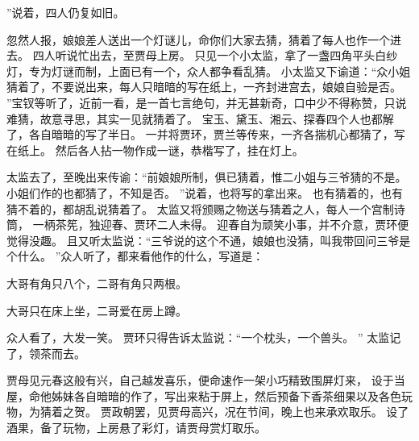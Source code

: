 ”说着，四人仍复如旧。
\par
忽然人报，娘娘差人送出一个灯谜儿，命你们大家去猜，猜着了每人也作一个进去。
四人听说忙出去，至贾母上房。
只见一个小太监，拿了一盏四角平头白纱灯，专为灯谜而制，上面已有一个，众人都争看乱猜。
小太监又下谕道：“众小姐猜着了，不要说出来，每人只暗暗的写在纸上，一齐封进宫去，娘娘自验是否。
”宝钗等听了，近前一看，是一首七言绝句，并无甚新奇，口中少不得称赞，只说难猜，故意寻思，其实一见就猜着了。
宝玉、黛玉、湘云、探春四个人也都解了，各自暗暗的写了半日。
一并将贾环，贾兰等传来，一齐各揣机心都猜了，写在纸上。
然后各人拈一物作成一谜，恭楷写了，挂在灯上。
\par
太监去了，至晚出来传谕：“前娘娘所制，俱已猜着，惟二小姐与三爷猜的不是。
小姐们作的也都猜了，不知是否。
”说着，也将写的拿出来。
也有猜着的，也有猜不着的，都胡乱说猜着了。
太监又将颁赐之物送与猜着之人，每人一个宫制诗筒，
一柄茶筅，独迎春、贾环二人未得。
迎春自为顽笑小事，并不介意，贾环便觉得没趣。
且又听太监说：“三爷说的这个不通，娘娘也没猜，叫我带回问三爷是个什么。
”众人听了，都来看他作的什么，写道是：\par
\hop
大哥有角只八个，二哥有角只两根。
\par
大哥只在床上坐，二哥爱在房上蹲。
\par
\hop
众人看了，大发一笑。
贾环只得告诉太监说：“一个枕头，一个兽头。
”
太监记了，领茶而去。
\par
贾母见元春这般有兴，自己越发喜乐，便命速作一架小巧精致围屏灯来，
设于当屋，命他姊妹各自暗暗的作了，写出来粘于屏上，然后预备下香茶细果以及各色玩物，为猜着之贺。
贾政朝罢，见贾母高兴，况在节间，晚上也来承欢取乐。
设了酒果，备了玩物，上房悬了彩灯，请贾母赏灯取乐。
